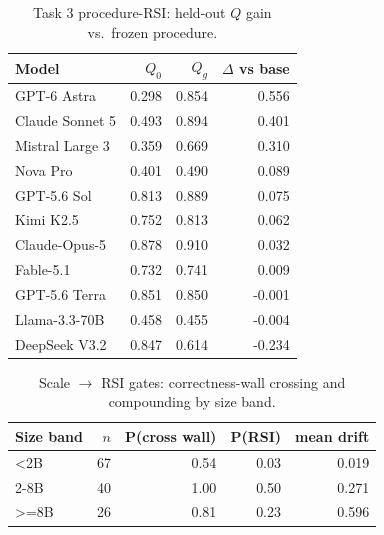 \documentclass[11pt]{article}
\begin{document}
\begin{table}[H]\centering
\begin{tabular}{lrrr}
\toprule
Model & $Q_0$ & $Q_g$ & $\Delta$ vs base \\
\midrule
GPT-6 Astra & 0.298 & 0.854 & 0.556 \\
Claude Sonnet 5 & 0.493 & 0.894 & 0.401 \\
Mistral Large 3 & 0.359 & 0.669 & 0.310 \\
Nova Pro & 0.401 & 0.490 & 0.089 \\
GPT-5.6 Sol & 0.813 & 0.889 & 0.075 \\
Kimi K2.5 & 0.752 & 0.813 & 0.062 \\
Claude-Opus-5 & 0.878 & 0.910 & 0.032 \\
Fable-5.1 & 0.732 & 0.741 & 0.009 \\
GPT-5.6 Terra & 0.851 & 0.850 & -0.001 \\
Llama-3.3-70B & 0.458 & 0.455 & -0.004 \\
DeepSeek V3.2 & 0.847 & 0.614 & -0.234 \\
\bottomrule
\end{tabular}
\caption{Task 3 procedure-RSI: held-out $Q$ gain vs.\ frozen procedure.}
\label{tab:t3}
\end{table}
\begin{table}[H]\centering
\begin{tabular}{lrrrr}
\toprule
Size band & $n$ & P(cross wall) & P(RSI) & mean drift \\
\midrule
<2B & 67 & 0.54 & 0.03 & 0.019 \\
2-8B & 40 & 1.00 & 0.50 & 0.271 \\
>=8B & 26 & 0.81 & 0.23 & 0.596 \\
\bottomrule
\end{tabular}
\caption{Scale $\to$ RSI gates: correctness-wall crossing and compounding by size band.}
\label{tab:gates}
\end{table}
\end{document}
